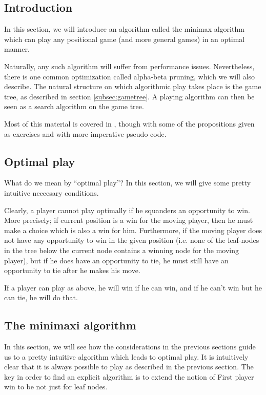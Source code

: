 \subsection{Introduction}

In this section, we will introduce an algorithm called the minimax algorithm which can play any positional game (and more general games) in an optimal manner.

Naturally, any such algorithm will suffer from performance issues.
Nevertheless, there is one common optimization called alpha-beta pruning, which we will also describe.
The natural structure on which algorithmic play takes place is the game tree, as described in section \ref{subsec:gametree}.
A playing algorithm can then be seen as a search algorithm on the game tree.


Most of this material is covered in \citep{aimodernapproach}, though with some of the propositions given as exercises and with more imperative pseudo code.

\subsection{Optimal play}

What do we mean by ``optimal play''?
In this section, we will give some pretty intuitive neccesary conditions.

Clearly, a player cannot play optimally if he squanders an opportunity to win.
More precisely; if current position is a win for the moving player, then he must make a choice which is also a win for him.
Furthermore, if the moving player does not have any opportunity to win in the given position (i.e. none of the leaf-nodes in the tree below the current node contains a winning node for the moving player), but if he does have an opportunity to tie, he must still have an opportunity to tie after he makes his move.

If a player can play as above, he will win if he can win, and if he can't win but he can tie, he will do that.

\subsection{The minimaxi algorithm}
\label{sec:minimaxi}

In this section, we will see how the considerations in the previous sections guide us to a pretty intuitive algorithm which leads to optimal play.
It is intuitively clear that it is always possible to play as described in the previous section.
The key in order to find an explicit algorithm is to extend the notion of First player win to be not just for leaf nodes.

